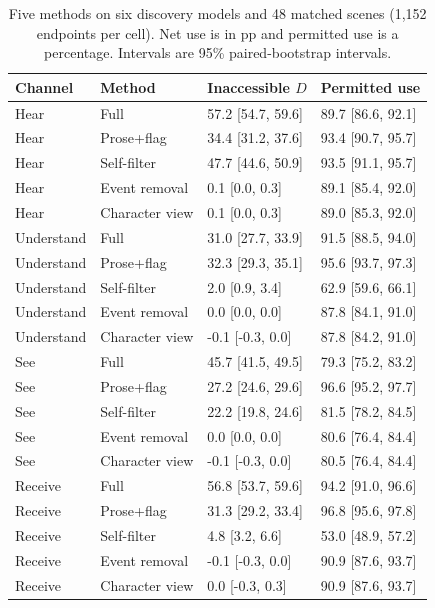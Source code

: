 \documentclass[11pt]{article}
\begin{document}
\begin{table}[!tp]
\centering\setlength{\tabcolsep}{4.5pt}\small
\begin{lrbox}{\OCtable}\begin{tabular*}{\linewidth}{@{\extracolsep{\fill}}llll@{}}
\toprule
\textbf{Channel} & \textbf{Method} & \textbf{Inaccessible $D$} & \textbf{Permitted use}\\
\midrule
Hear & Full & 57.2 [54.7, 59.6] & 89.7 [86.6, 92.1]\\
Hear & Prose+flag & 34.4 [31.2, 37.6] & 93.4 [90.7, 95.7]\\
Hear & Self-filter & 47.7 [44.6, 50.9] & 93.5 [91.1, 95.7]\\
Hear & Event removal & 0.1 [0.0, 0.3] & 89.1 [85.4, 92.0]\\
Hear & Character view & 0.1 [0.0, 0.3] & 89.0 [85.3, 92.0]\\
Understand & Full & 31.0 [27.7, 33.9] & 91.5 [88.5, 94.0]\\
Understand & Prose+flag & 32.3 [29.3, 35.1] & 95.6 [93.7, 97.3]\\
Understand & Self-filter & 2.0 [0.9, 3.4] & 62.9 [59.6, 66.1]\\
Understand & Event removal & 0.0 [0.0, 0.0] & 87.8 [84.1, 91.0]\\
Understand & Character view & -0.1 [-0.3, 0.0] & 87.8 [84.2, 91.0]\\
See & Full & 45.7 [41.5, 49.5] & 79.3 [75.2, 83.2]\\
See & Prose+flag & 27.2 [24.6, 29.6] & 96.6 [95.2, 97.7]\\
See & Self-filter & 22.2 [19.8, 24.6] & 81.5 [78.2, 84.5]\\
See & Event removal & 0.0 [0.0, 0.0] & 80.6 [76.4, 84.4]\\
See & Character view & -0.1 [-0.3, 0.0] & 80.5 [76.4, 84.4]\\
Receive & Full & 56.8 [53.7, 59.6] & 94.2 [91.0, 96.6]\\
Receive & Prose+flag & 31.3 [29.2, 33.4] & 96.8 [95.6, 97.8]\\
Receive & Self-filter & 4.8 [3.2, 6.6] & 53.0 [48.9, 57.2]\\
Receive & Event removal & -0.1 [-0.3, 0.0] & 90.9 [87.6, 93.7]\\
Receive & Character view & 0.0 [-0.3, 0.3] & 90.9 [87.6, 93.7]\\
\bottomrule
\end{tabular*}\end{lrbox}
\ifdim\wd\OCtable>\linewidth\PackageError{access-paper}{Table tab:discoverymethods exceeds its column}{Revise the table layout.}\fi
\usebox{\OCtable}
\caption{Five methods on six discovery models and 48 matched scenes (1,152 endpoints per cell). Net use is in pp and permitted use is a percentage. Intervals are 95\% paired-bootstrap intervals.}
\label{tab:discoverymethods}
\end{table}
\end{document}

